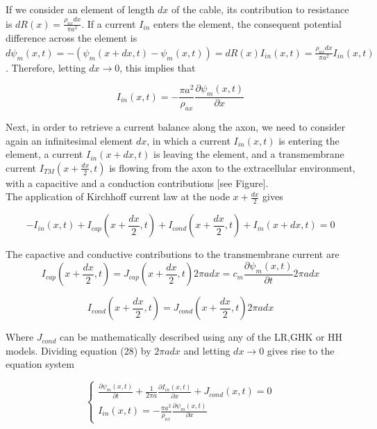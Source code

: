 \documentclass[a4paper]{article}
\begin{document}
If we consider an element of length $dx$ of the cable, its contribution to resistance is $dR(x) = \frac{\rho_{ax} dx}{\pi a^2}$. If a current $I_{in}$ enters the element, the consequent potential difference across the element is $ d\psi_m(x,t) = - \left(\psi_m(x+dx,t) - \psi_m(x,t)\right) = dR(x)I_{in}(x,t) = \frac{\rho_{ax} dx}{\pi a^2} I_{in}(x,t)$. Therefore, letting $dx \rightarrow 0$, this implies that

\begin{equation}
	I_{in}(x,t) = -\frac{\pi a^2}{\rho_{ax}}\frac{\partial \psi_m(x,t)}{\partial x}
\end{equation}

Next, in order to retrieve a current balance along the axon, we need to consider again an infinitesimal element $dx$, in which a current $I_{in}(x,t)$ is entering the element, a current $I_{in}(x+dx,t)$ is leaving the element, and a transmembrane current $I_{TM}(x+\frac{dx}{2},t)$ is flowing from the axon to the extracellular environment, with a capacitive and a conduction contributions [see Figure].\\
The application of Kirchhoff current law at the node  $x+\frac{dx}{2}$ gives

\begin{equation}
- I_{in}(x,t) + I_{cap}(x+\frac{dx}{2},t) + I_{cond}(x+\frac{dx}{2},t) + I_{in}(x+dx,t) = 0
\end{equation}

The capactive and conductive contributions to the transmembrane current are
\begin{equation}
  I_{cap}(x+\frac{dx}{2},t) = J_{cap}(x+\frac{dx}{2},t) 2 \pi a dx = c_m \frac{\partial \psi_m(x,t)}{\partial t} 2 \pi a dx 
\end{equation}

\begin{equation}
I_{cond}(x+\frac{dx}{2},t) = J_{cond}(x+\frac{dx}{2},t) 2 \pi a dx 
\end{equation}

Where $J_{cond}$ can be mathematically described using any of the LR,GHK or HH models. Dividing equation (28)  by $2 \pi a dx $ and letting $dx \rightarrow 0$ gives rise to the equation system

\begin{equation}
\begin{cases}
\frac{\partial \psi_m(x,t)}{\partial t} + \frac{1}{2 \pi a }\frac{\partial I_{in}(x,t)}{\partial x} + J_{cond}(x,t) = 0 \\
I_{in}(x,t) = -\frac{\pi a^2}{\rho_{ax}}\frac{\partial \psi_m(x,t)}{\partial x}
\end{cases}
\end{equation}
\end{document}
